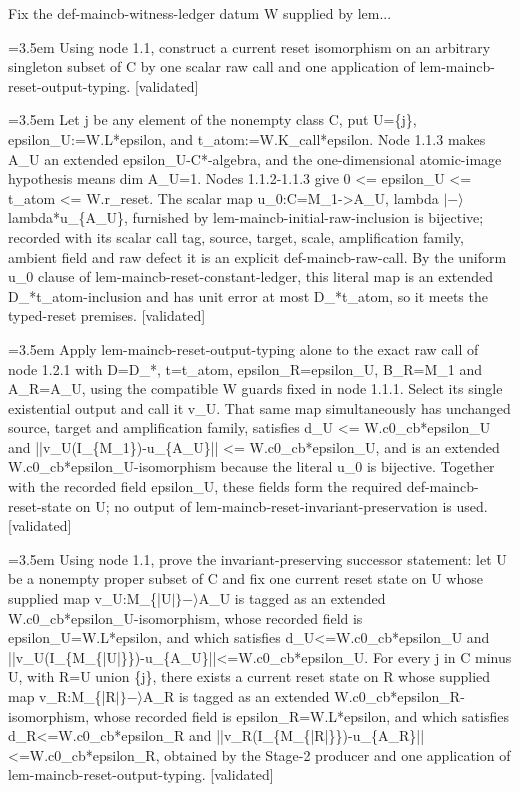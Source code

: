\documentclass{article}
\newcommand{\step}[1]{\par\noindent\hangindent=3.5em\hangafter=1%
  \makebox[3.5em][l]{\textbf{#1.}}}
\newcommand{\steptag}[1]{\hfill{\small\textsf{[#1]}}}
\begin{document}
\begin{proofbox}{Fix the def-maincb-witness-ledger datum W supplied by lem...}
\step{1.2} Using node 1.1, construct a current reset isomorphism on an arbitrary singleton subset of C by one scalar raw call and one application of lem-maincb-reset-output-typing. \steptag{validated} \\[6pt]
\step{1.2.1} Let j be any element of the nonempty class C, put U=\{j\}, epsilon\_U:=W.L*epsilon, and t\_atom:=W.K\_call*epsilon. Node 1.1.3 makes A\_U an extended epsilon\_U-C*-algebra, and the one-dimensional atomic-image hypothesis means dim A\_U=1. Nodes 1.1.2-1.1.3 give 0 <= epsilon\_U <= t\_atom <= W.r\_reset. The scalar map u\_0:C=M\_1->A\_U, lambda $|-\rangle$ lambda*u\_\{A\_U\}, furnished by lem-maincb-initial-raw-inclusion is bijective; recorded with its scalar call tag, source, target, scale, amplification family, ambient field and raw defect it is an explicit def-maincb-raw-call. By the uniform u\_0 clause of lem-maincb-reset-constant-ledger, this literal map is an extended D\_*t\_atom-inclusion and has unit error at most D\_*t\_atom, so it meets the typed-reset premises. \steptag{validated} \\[4pt]
\step{1.2.2} Apply lem-maincb-reset-output-typing alone to the exact raw call of node 1.2.1 with D=D\_*, t=t\_atom, epsilon\_R=epsilon\_U, B\_R=M\_1 and A\_R=A\_U, using the compatible W guards fixed in node 1.1.1. Select its single existential output and call it v\_U. That same map simultaneously has unchanged source, target and amplification family, satisfies d\_U <= W.c0\_cb*epsilon\_U and ||v\_U(I\_\{M\_1\})-u\_\{A\_U\}|| <= W.c0\_cb*epsilon\_U, and is an extended W.c0\_cb*epsilon\_U-isomorphism because the literal u\_0 is bijective. Together with the recorded field epsilon\_U, these fields form the required def-maincb-reset-state on U; no output of lem-maincb-reset-invariant-preservation is used. \steptag{validated} \\[4pt]
\step{1.3} Using node 1.1, prove the invariant-preserving successor statement: let U be a nonempty proper subset of C and fix one current reset state on U whose supplied map v\_U:M\_\{|U$|\}-\rangle$A\_U is tagged as an extended W.c0\_cb*epsilon\_U-isomorphism, whose recorded field is epsilon\_U=W.L*epsilon, and which satisfies d\_U<=W.c0\_cb*epsilon\_U and ||v\_U(I\_\{M\_\{|U|\}\})-u\_\{A\_U\}||<=W.c0\_cb*epsilon\_U. For every j in C minus U, with R=U union \{j\}, there exists a current reset state on R whose supplied map v\_R:M\_\{|R$|\}-\rangle$A\_R is tagged as an extended W.c0\_cb*epsilon\_R-isomorphism, whose recorded field is epsilon\_R=W.L*epsilon, and which satisfies d\_R<=W.c0\_cb*epsilon\_R and ||v\_R(I\_\{M\_\{|R|\}\})-u\_\{A\_R\}||<=W.c0\_cb*epsilon\_R, obtained by the Stage-2 producer and one application of lem-maincb-reset-output-typing. \steptag{validated} \\[6pt]

\end{proofbox}
\end{document}

